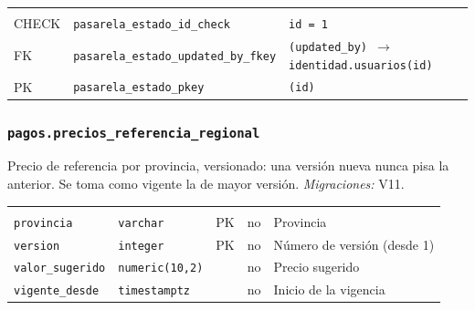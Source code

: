 {\small
\begin{xltabular}{\textwidth}{@{}>{\raggedright\arraybackslash}p{1.7cm} >{\raggedright\arraybackslash}p{4.6cm} L@{}}
    \toprule
     &  &  \\
    \midrule
    \endfirsthead
    \toprule
     &  &  \\
    \midrule
    \endhead
    \bottomrule
    \endfoot
    CHECK & \texttt{pasarela\_\allowbreak{}estado\_\allowbreak{}id\_\allowbreak{}check} & \texttt{id = 1} \\
    FK & \texttt{pasarela\_\allowbreak{}estado\_\allowbreak{}updated\_\allowbreak{}by\_\allowbreak{}fkey} & \texttt{(\allowbreak{}updated\_\allowbreak{}by) $\rightarrow$ identidad.usuarios(\allowbreak{}id)} \\
    PK & \texttt{pasarela\_\allowbreak{}estado\_\allowbreak{}pkey} & \texttt{(\allowbreak{}id)} \\
\end{xltabular}
}

\subsubsection{\texorpdfstring{\texttt{pagos.precios\_\allowbreak{}referencia\_\allowbreak{}regional}}{pagos.precios\_referencia\_regional}}\label{dd:pagos.precios_referencia_regional}

Precio de referencia por provincia, versionado: una versión nueva nunca pisa la anterior. Se toma como vigente la de mayor versión. \emph{Migraciones:} V11.

{\small
\begin{xltabular}{\textwidth}{@{}>{\raggedright\arraybackslash}p{3.6cm} >{\raggedright\arraybackslash}p{2.3cm} >{\raggedright\arraybackslash}p{1cm} >{\centering\arraybackslash}p{0.85cm} L@{}}
    \toprule
     &  &  &  &  \\
    \midrule
    \endfirsthead
    \toprule
     &  &  &  &  \\
    \midrule
    \endhead
    \bottomrule
    \endfoot
    \texttt{provincia} & \texttt{varchar} & PK & no & Provincia \\
    \texttt{version} & \texttt{integer} & PK & no & Número de versión (desde 1) \\
    \texttt{valor\_\allowbreak{}sugerido} & \texttt{numeric(\allowbreak{}10,\allowbreak{}2)} &  & no & Precio sugerido \\
    \texttt{vigente\_\allowbreak{}desde} & \texttt{timestamptz} &  & no & Inicio de la vigencia \\
\end{xltabular}
}


